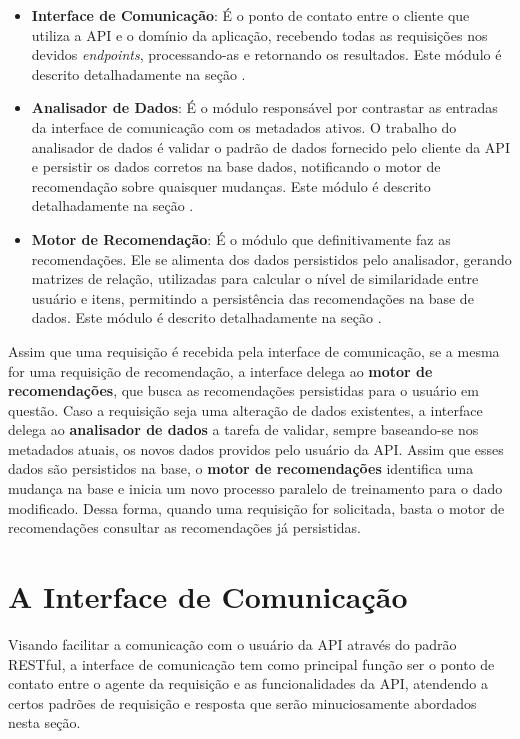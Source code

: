 \documentclass[12pt, openright, oneside, a4paper, brazil]{abntex2}
\begin{document}
\begin{itemize}
	\item \textbf{Interface de Comunicação}: É o ponto de contato entre o cliente que utiliza a API e o domínio da aplicação, recebendo todas as requisições nos devidos \textit{endpoints}, processando-as e retornando os resultados. Este módulo é descrito detalhadamente na seção .

	\item \textbf{Analisador de Dados}: É o módulo responsável por contrastar as entradas da interface de comunicação com os metadados ativos. O trabalho do analisador de dados é validar o padrão de dados fornecido pelo cliente da API e persistir os dados corretos na base dados, notificando o motor de recomendação sobre quaisquer mudanças. Este módulo é descrito detalhadamente na seção .

	\item \textbf{Motor de Recomendação}: É o módulo que definitivamente faz as recomendações. Ele se alimenta dos dados persistidos pelo analisador, gerando matrizes de relação, utilizadas para calcular o nível de similaridade entre usuário e itens, permitindo a persistência das recomendações na base de dados. Este módulo é descrito detalhadamente na seção .
\end{itemize}

Assim que uma requisição é recebida pela interface de comunicação, se a mesma for uma requisição de recomendação, a interface delega ao \textbf{motor de recomendações}, que busca as recomendações persistidas para o usuário em questão. Caso a requisição seja uma alteração de dados existentes, a interface delega ao \textbf{analisador de dados} a tarefa de validar, sempre baseando-se nos metadados atuais, os novos dados providos pelo usuário da API. Assim que esses dados são persistidos na base, o \textbf{motor de recomendações} identifica uma mudança na base e inicia um novo processo paralelo de treinamento para o dado modificado. Dessa forma, quando uma requisição for solicitada, basta o motor de recomendações consultar as recomendações já persistidas.

\section{A Interface de Comunicação} \label{interface}

Visando facilitar a comunicação com o usuário da API através do padrão RESTful, a interface de comunicação tem como principal função ser o ponto de contato entre o agente da requisição e as funcionalidades da API, atendendo a certos padrões de requisição e resposta que serão minuciosamente abordados nesta seção.
\end{document}
